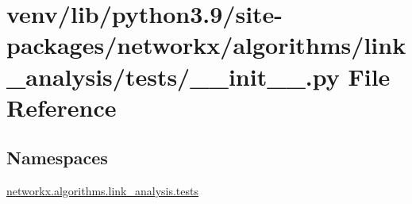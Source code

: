 \hypertarget{venv_2lib_2python3_89_2site-packages_2networkx_2algorithms_2link__analysis_2tests_2____init_____8py}{}\section{venv/lib/python3.9/site-\/packages/networkx/algorithms/link\+\_\+analysis/tests/\+\_\+\+\_\+init\+\_\+\+\_\+.py File Reference}
\label{venv_2lib_2python3_89_2site-packages_2networkx_2algorithms_2link__analysis_2tests_2____init_____8py}
\subsection*{Namespaces}
\begin{DoxyCompactItemize}
\item 
 \hyperlink{namespacenetworkx_1_1algorithms_1_1link__analysis_1_1tests}{networkx.\+algorithms.\+link\+\_\+analysis.\+tests}
\end{DoxyCompactItemize}
